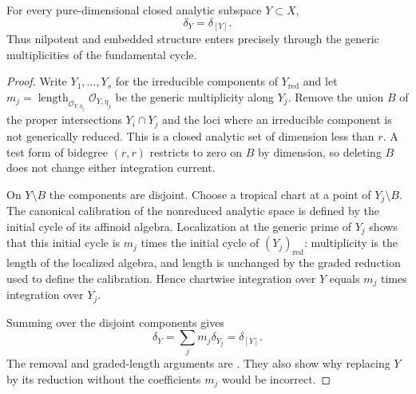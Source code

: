 \begin{theorem}
\label{thm:current-fundamental-cycle}
For every pure-dimensional closed analytic subspace $Y\subset X$,
\[
                         \delta_Y=\delta_{[Y]}.
\]
Thus nilpotent and embedded structure enters precisely through the generic
multiplicities of the fundamental cycle.
\end{theorem}
\begin{proof}
Write $Y_1,\ldots,Y_s$ for the irreducible components of
$Y_{\mathrm{red}}$ and let
$m_j=\operatorname{length}_{\mathcal O_{Y,\eta_j}}
\mathcal O_{Y,\eta_j}$ be the generic multiplicity along $Y_j$.  Remove the
union $B$ of the proper intersections $Y_i\cap Y_j$ and the loci where an
irreducible component is not generically reduced.  This is a closed analytic
set of dimension less than $r$.  A test form of bidegree $(r,r)$ restricts
to zero on $B$ by dimension, so deleting $B$ does not change either
integration current.

On $Y\setminus B$ the components are disjoint.  Choose a tropical chart at a
point of $Y_j\setminus B$.  The canonical calibration of the nonreduced
analytic space is defined by the initial cycle of its affinoid algebra.
Localization at the generic prime of $Y_j$ shows that this initial cycle is
$m_j$ times the initial cycle of $(Y_j)_{\mathrm{red}}$: multiplicity is the
length of the localized algebra, and length is unchanged by the graded
reduction used to define the calibration.  Hence chartwise integration over
$Y$ equals $m_j$ times integration over $Y_j$.

Summing over the disjoint components gives
\[
          \delta_Y=\sum_jm_j\delta_{Y_j}=\delta_{[Y]}.
\]
The removal and graded-length arguments are
\cite[Proposition~16.6.3]{CLD25}.  They also show why replacing $Y$ by its
reduction without the coefficients $m_j$ would be incorrect.
\end{proof}

